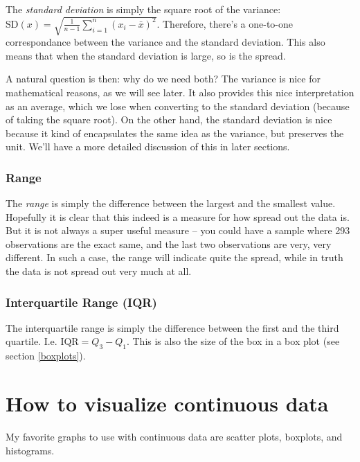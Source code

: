\documentclass[]{book}
\theoremstyle{definition}
\theoremstyle{definition}
\theoremstyle{definition}
\theoremstyle{remark}
\begin{document}
The \emph{standard deviation} is simply the square root of the variance: \(\text{SD}(x) = \sqrt{\frac{1}{n-1} \sum_{i=1}^n (x_i - \bar{x})^2}\). Therefore, there's a one-to-one correspondance between the variance and the standard deviation. This also means that when the standard deviation is large, so is the spread.

A natural question is then: why do we need both? The variance is nice for mathematical reasons, as we will see later. It also provides this nice interpretation as an average, which we lose when converting to the standard deviation (because of taking the square root). On the other hand, the standard deviation is nice because it kind of encapsulates the same idea as the variance, but preserves the unit. We'll have a more detailed discussion of this in later sections.

\hypertarget{range}{%
\subsubsection{Range}\label{range}}

The \emph{range} is simply the difference between the largest and the smallest value. Hopefully it is clear that this indeed is a measure for how spread out the data is. But it is not always a super useful measure -- you could have a sample where 293 observations are the exact same, and the last two observations are very, very different. In such a case, the range will indicate quite the spread, while in truth the data is not spread out very much at all.

\hypertarget{interquartile-range-iqr}{%
\subsubsection{Interquartile Range (IQR)}\label{interquartile-range-iqr}}

The interquartile range is simply the difference between the first and the third quartile. I.e. \(\text{IQR} = Q_3 - Q_1\). This is also the size of the box in a box plot (see section \ref{boxplots}).

\hypertarget{how-to-visualize-continuous-data}{%
\section{How to visualize continuous data}\label{how-to-visualize-continuous-data}}

My favorite graphs to use with continuous data are scatter plots, boxplots, and histograms.
\end{document}
